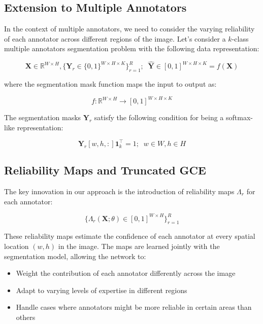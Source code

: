 \subsection{Extension to Multiple Annotators}

In the context of multiple annotators, we need to consider the
varying reliability of each annotator across different regions of the
image. Let's consider a $k$-class multiple annotators segmentation
problem with the following data representation:

\begin{equation}
  \mathbf X \in \mathbb{R}^{W \times H}, \{ \mathbf Y_r \in
  \{0,1\}^{W \times H \times K} \}_{r=1}^R; \;\; \mathbf {\hat Y} \in
  [0,1]^{W\times H \times K} = f(\mathbf X)
\end{equation}

where the segmentation mask function maps the input to output as:

\begin{equation}
  f: \mathbb  R ^{W\times H} \to [0,1]^{W\times H\times K}
\end{equation}

The segmentation masks $\mathbf Y_r$ satisfy the following condition
for being a softmax-like representation:

\begin{equation}
  \mathbf Y_r[w,h,:] \mathbf{1} ^ \top _ k = 1; \;\; w \in W, h \in H
\end{equation}

\subsection{Reliability Maps and Truncated GCE}

The key innovation in our approach is the introduction of reliability
maps $\Lambda_r$ for each annotator:

\begin{equation}
  \bigg\{ \Lambda_r (\mathbf X; \theta ) \in [0,1] ^{W\times H} \bigg\}_{r=1}^R
\end{equation}

These reliability maps estimate the confidence of each annotator at
every spatial location $(w,h)$ in the image. The maps are learned
jointly with the segmentation model, allowing the network to:

\begin{itemize}
  \item Weight the contribution of each annotator differently across the image
  \item Adapt to varying levels of expertise in different regions
  \item Handle cases where annotators might be more reliable in
    certain areas than others
\end{itemize}

